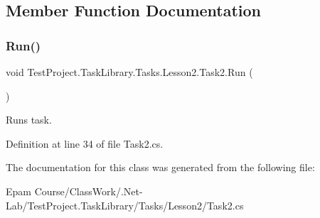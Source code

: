 \subsection{Member Function Documentation}
\mbox{\label{class_test_project_1_1_task_library_1_1_tasks_1_1_lesson2_1_1_task2_ad1a73d4b561ec864dcfe1f646772fc2d}} 
\subsubsection{\texorpdfstring{Run()}{Run()}}
{\footnotesize\ttfamily void Test\+Project.\+Task\+Library.\+Tasks.\+Lesson2.\+Task2.\+Run (\begin{DoxyParamCaption}{ }\end{DoxyParamCaption})}



Runs task. 



Definition at line 34 of file Task2.\+cs.



The documentation for this class was generated from the following file\+:\begin{DoxyCompactItemize}
\item 
Epam Course/\+Class\+Work/.\+Net-\/\+Lab/\+Test\+Project.\+Task\+Library/\+Tasks/\+Lesson2/Task2.\+cs\end{DoxyCompactItemize}
